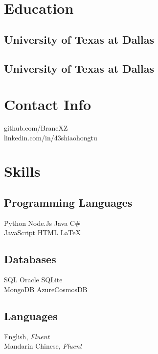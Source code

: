 \documentclass{fortythree_resume}
\begin{document}
\sectionsep

\begin{minipage}[t]{0.33\textwidth}

\section{Education}
\subsection{University of Texas at Dallas}
\subsection{University of Texas at Dallas}
\sectionsep

\section{Contact Info}
\faGithub \hspace{0em} github.com/BraneXZ\\
\faLinkedin \hspace{0em} linkedin.com/in/43shiaohongtu
\sectionsep

\section{Skills}
\subsection{Programming Languages}
Python \textbullet{} Node.Js \textbullet{} Java \textbullet{} C\# \\
JavaScript \textbullet{} HTML \textbullet{} \LaTeX
\subsection{Databases}
SQL \textbullet{} Oracle \textbullet{} SQLite\\ 
MongoDB \textbullet{} AzureCosmosDB
\subsection{Languages}
English, \emph{Fluent}\\
Mandarin Chinese, \emph{Fluent}\\
\sectionsep


\end{minipage}
\end{document}

